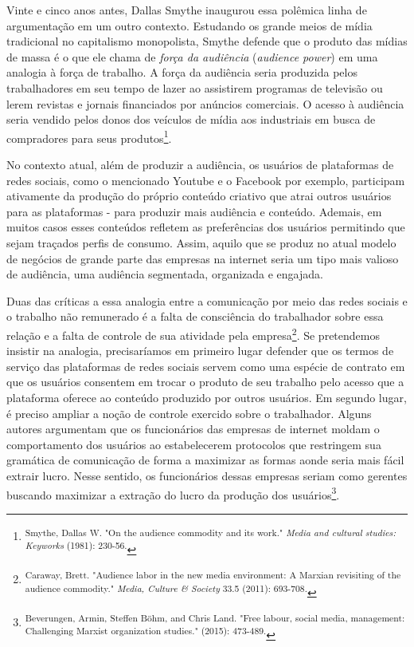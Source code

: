 Vinte e cinco anos antes, Dallas Smythe inaugurou essa polêmica linha de
argumentação em um outro contexto. Estudando os grande meios de mídia
tradicional no capitalismo monopolista, Smythe defende que o produto das
mídias de massa é o que ele chama de \emph{força da audiência}
(\emph{audience power}) em uma analogia à força de trabalho. A força da
audiência seria produzida pelos trabalhadores em seu tempo de lazer ao
assistirem programas de televisão ou lerem revistas e jornais
financiados por anúncios comerciais. O acesso à audiência seria vendido
pelos donos dos veículos de mídia aos industriais em busca de
compradores para seus produtos\footnote{\textsuperscript{Smythe, Dallas
  W. "On the audience commodity and its work." \emph{Media and cultural
  studies: Keyworks} (1981): 230-56.}}.

No contexto atual, além de produzir a audiência, os usuários de
plataformas de redes sociais, como o mencionado Youtube e o Facebook por
exemplo, participam ativamente da produção do próprio conteúdo criativo
que atrai outros usuários para as plataformas - para produzir mais
audiência e conteúdo. Ademais, em muitos casos esses conteúdos refletem
as preferências dos usuários permitindo que sejam traçados perfis de
consumo. Assim, aquilo que se produz no atual modelo de negócios de
grande parte das empresas na internet seria um tipo mais valioso de
audiência, uma audiência segmentada, organizada e engajada.

Duas das críticas a essa analogia entre a comunicação por meio das redes
sociais e o trabalho não remunerado é a falta de consciência do
trabalhador sobre essa relação e a falta de controle de sua atividade
pela empresa\footnote{\textsuperscript{Caraway, Brett. "Audience labor
  in the new media environment: A Marxian revisiting of the audience
  commodity." \emph{Media, Culture \& Society} 33.5 (2011): 693-708.}}.
Se pretendemos insistir na analogia, precisaríamos em primeiro lugar
defender que os termos de serviço das plataformas de redes sociais
servem como uma espécie de contrato em que os usuários consentem em
trocar o produto de seu trabalho pelo acesso que a plataforma oferece ao
conteúdo produzido por outros usuários. Em segundo lugar, é preciso
ampliar a noção de controle exercido sobre o trabalhador. Alguns autores
argumentam que os funcionários das empresas de internet moldam o
comportamento dos usuários ao estabelecerem protocolos que restringem
sua gramática de comunicação de forma a maximizar as formas aonde seria
mais fácil extrair lucro. Nesse sentido, os funcionários dessas empresas
seriam como gerentes buscando maximizar a extração do lucro da produção
dos usuários\footnote{\textsuperscript{Beverungen, Armin, Steffen Böhm,
  and Chris Land. "Free labour, social media, management: Challenging
  Marxist organization studies." (2015): 473-489.}}.

